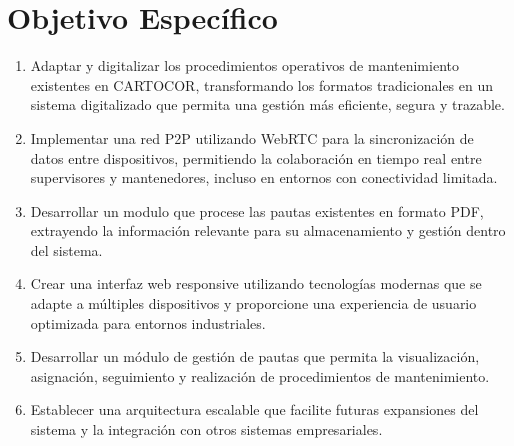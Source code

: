 \documentclass[10pt,a4paper]{report}
\begin{document}
 
\newpage
\section*{Objetivo Específico}

\begin{enumerate}
    \item Adaptar y digitalizar los procedimientos operativos de mantenimiento existentes en CARTOCOR, transformando los formatos tradicionales en un sistema digitalizado que permita una gestión más eficiente, segura y trazable.
    \item Implementar una red P2P utilizando WebRTC para la sincronización de datos entre dispositivos, permitiendo la colaboración en tiempo real entre supervisores y mantenedores, incluso en entornos con conectividad limitada.
    \item Desarrollar un modulo que procese las pautas existentes en formato PDF, extrayendo la información relevante para su almacenamiento y gestión dentro del sistema.
    \item Crear una interfaz web responsive utilizando tecnologías modernas que se adapte a múltiples dispositivos y proporcione una experiencia de usuario optimizada para entornos industriales.
    \item Desarrollar un módulo de gestión de pautas que permita la visualización, asignación, seguimiento y realización de procedimientos de mantenimiento.
    \item Establecer una arquitectura escalable que facilite futuras expansiones del sistema y la integración con otros sistemas empresariales.
\end{enumerate}
\end{document}
